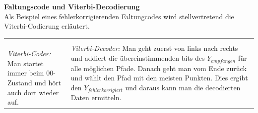 	\textbf{Faltungscode und Viterbi-Decodierung} \\
	Als Beispiel eines fehlerkorrigierenden Faltungcodes wird stellvertretend die Viterbi-Codierung erläutert.\\
	\begin{tabular}{ll}
		\parbox{6cm}{
			 \\ 
			\textit{Viterbi-Coder:} Man startet immer beim 00-Zustand und hört auch dort wieder auf.
		}	
		& \parbox{12cm}{
			 \\ 
			\textit{Viterbi-Decoder:} Man geht zuerst von links nach rechts und addiert die übereinstimmenden
			bits des $Y_{empfangen}$ für alle möglichen Pfade. Danach geht man vom Ende zurück und
			wählt den Pfad mit den meisten Punkten. Dies ergibt den $Y_{fehlerkorrigiert}$ und
			daraus kann man die decodierten Daten ermitteln.
		}
	\end{tabular}
	
